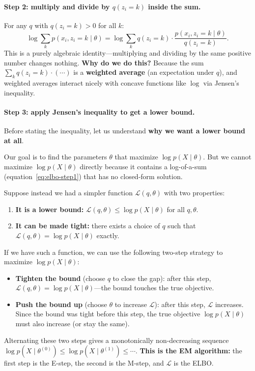 \documentclass[11pt]{article}
\theoremstyle{definition}
\theoremstyle{plain}
\theoremstyle{remark}
\begin{document}
\paragraph{Step 2: multiply and divide by $q(z_i=k)$ inside the sum.} For any $q$ with $q(z_i=k)>0$ for all $k$:
\begin{equation}
  \log\sum_k p(x_i,z_i=k\mid\theta) = \log\sum_k q(z_i=k)\cdot\frac{p(x_i,z_i=k\mid\theta)}{q(z_i=k)}.
  \label{eq:elbo-step2}
\end{equation}
This is a purely algebraic identity---multiplying and dividing by the same positive number changes nothing. \textbf{Why do we do this?} Because the sum $\sum_k q(z_i=k)\cdot(\cdots)$ is a \textbf{weighted average} (an expectation under $q$), and weighted averages interact nicely with concave functions like $\log$ via Jensen's inequality.

\paragraph{Step 3: apply Jensen's inequality to get a lower bound.}

Before stating the inequality, let us understand \textbf{why we want a lower bound at all}.

Our goal is to find the parameters $\theta$ that maximize $\log p(X\mid\theta)$. But we cannot maximize $\log p(X\mid\theta)$ directly because it contains a log-of-a-sum (equation~\eqref{eq:elbo-step1}) that has no closed-form solution.

Suppose instead we had a simpler function $\mathcal{L}(q,\theta)$ with two properties:
\begin{enumerate}[leftmargin=*,itemsep=2pt]
  \item \textbf{It is a lower bound:} $\mathcal{L}(q,\theta)\leq\log p(X\mid\theta)$ for all $q,\theta$.
  \item \textbf{It can be made tight:} there exists a choice of $q$ such that $\mathcal{L}(q,\theta)=\log p(X\mid\theta)$ exactly.
\end{enumerate}
If we have such a function, we can use the following two-step strategy to maximize $\log p(X\mid\theta)$:
\begin{itemize}[leftmargin=*,itemsep=2pt]
  \item \textbf{Tighten the bound} (choose $q$ to close the gap): after this step, $\mathcal{L}(q,\theta)=\log p(X\mid\theta)$---the bound touches the true objective.
  \item \textbf{Push the bound up} (choose $\theta$ to increase $\mathcal{L}$): after this step, $\mathcal{L}$ increases. Since the bound was tight before this step, the true objective $\log p(X\mid\theta)$ must also increase (or stay the same).
\end{itemize}
Alternating these two steps gives a monotonically non-decreasing sequence $\log p(X\mid\theta^{(0)})\leq\log p(X\mid\theta^{(1)})\leq\cdots$. \textbf{This is the EM algorithm:} the first step is the E-step, the second is the M-step, and $\mathcal{L}$ is the ELBO.
\end{document}
